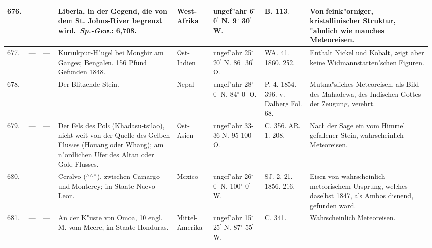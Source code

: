 \documentclass[a4paper, 8pt, oneside, polutonikogreek, german]{article}
\begin{document}
\begin{center}
\begin{longtable}{| p{4mm} | p{2mm} | p{15mm} | p{25mm} | p{16mm} | p{12mm} | p{13mm} | p{20mm} |}
        676. & --- & --- & Liberia, in der Gegend, die von dem St. Johns-River begrenzt wird. \emph{Sp.-Gew.}: 6,708. & West-Afrika & ungef"ahr 6$^\circ$ 0$^\prime$ N. 9$^\circ$ 30$^\prime$ W. & B. 113. & Von feink"orniger, kristallinischer Struktur, "ahnlich wie manches Meteoreisen. \\ \hline
        677. & --- & --- & Kurrukpur-H"ugel bei Monghir am Ganges; Bengalen. 156 Pfund Gefunden 1848. & Ost-Indien & ungef"ahr 25$^\circ$ 20$^\prime$ N. 86$^\circ$ 36$^\prime$ O. & WA. 41. 1860. 252. & Enthalt Nickel und Kobalt, zeigt aber keine Widmannstatten'schen Figuren. \\ \hline
        678. & --- & --- & Der Blitzende Stein. & Nepal & ungef"ahr 28$^\circ$ 0$^\prime$ N. 84$^\circ$ 0$^\prime$ O. & P. 4. 1854. 396. v. Dalberg Fol. 68. & Mutma"sliches Meteoreisen, als Bild des Mahadewa, des Indischen Gottes der Zeugung, verehrt. \\ \hline
        679. & --- & --- & Der Fels des Pols (Khadasu-tsilao), nicht weit von der Quelle des Gelben Flusses (Houang oder Whang); am n"ordlichen Ufer des Altan oder Gold-Flusses. & Ost-Asien & ungef"ahr 33-36 N. 95-100 O. & C. 356. AR. 1. 208. & Nach der Sage ein vom Himmel gefallener Stein, wahrscheinlich Meteoreisen. \\ \hline
        680. & --- & --- & Ceralvo ($^\wedge$$^\wedge$$^\wedge$), zwischen Camargo und Monterey; im Staate Nuevo-Leon. & Mexico & ungef"ahr 26$^\circ$ 0$^\prime$ N. 100$^\circ$ 0$^\prime$ W. & SJ. 2. 21. 1856. 216. & Eisen von wahrscheinlich meteorischem Ursprung, welches daselbst 1847, als Ambos dienend, gefunden ward. \\ \hline
        681. & --- & --- & An der K"uste von Omoa, 10 engl. M. vom Meere, im Staate Honduras. & Mittel-Amerika & ungef"ahr 15$^\circ$ 25$^\prime$ N. 87$^\circ$ 55$^\prime$ W. & C. 341. & Wahrscheinlich Meteoreisen. \\ \hline
    \end{longtable}
\end{center}
\clearpage
\end{document}

